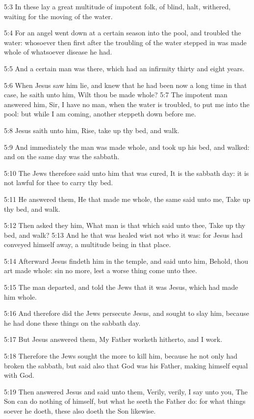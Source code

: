 5:3 In these lay a great multitude of impotent folk, of blind, halt, withered, waiting for the moving of the water.

5:4 For an angel went down at a certain season into the pool, and troubled the water: whosoever then first after the troubling of the water stepped in was made whole of whatsoever disease he had.

5:5 And a certain man was there, which had an infirmity thirty and eight years.

5:6 When Jesus saw him lie, and knew that he had been now a long time in that case, he saith unto him, Wilt thou be made whole?  5:7 The impotent man answered him, Sir, I have no man, when the water is troubled, to put me into the pool: but while I am coming, another steppeth down before me.

5:8 Jesus saith unto him, Rise, take up thy bed, and walk.

5:9 And immediately the man was made whole, and took up his bed, and walked: and on the same day was the sabbath.

5:10 The Jews therefore said unto him that was cured, It is the sabbath day: it is not lawful for thee to carry thy bed.

5:11 He answered them, He that made me whole, the same said unto me, Take up thy bed, and walk.

5:12 Then asked they him, What man is that which said unto thee, Take up thy bed, and walk?  5:13 And he that was healed wist not who it was: for Jesus had conveyed himself away, a multitude being in that place.

5:14 Afterward Jesus findeth him in the temple, and said unto him, Behold, thou art made whole: sin no more, lest a worse thing come unto thee.

5:15 The man departed, and told the Jews that it was Jesus, which had made him whole.

5:16 And therefore did the Jews persecute Jesus, and sought to slay him, because he had done these things on the sabbath day.

5:17 But Jesus answered them, My Father worketh hitherto, and I work.

5:18 Therefore the Jews sought the more to kill him, because he not only had broken the sabbath, but said also that God was his Father, making himself equal with God.

5:19 Then answered Jesus and said unto them, Verily, verily, I say unto you, The Son can do nothing of himself, but what he seeth the Father do: for what things soever he doeth, these also doeth the Son likewise.

